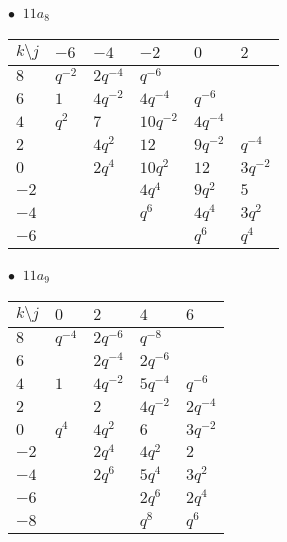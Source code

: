 \begin{minipage}{\linewidth}
$\bullet\ $ $11a_{8}$ \vspace{0.5em} \\
\begin{tabular}{l|lllll}
$k \setminus j$ & $-6$ & $-4$ & $-2$ & $0$ & $2$ \\
\hline
$8$ & $q^{-2}$ & $2q^{-4}$ & $q^{-6}$ &  &  \\
$6$ & $1$ & $4q^{-2}$ & $4q^{-4}$ & $q^{-6}$ &  \\
$4$ & $q^{2}$ & $7$ & $10q^{-2}$ & $4q^{-4}$ &  \\
$2$ &  & $4q^{2}$ & $12$ & $9q^{-2}$ & $q^{-4}$ \\
$0$ &  & $2q^{4}$ & $10q^{2}$ & $12$ & $3q^{-2}$ \\
$-2$ &  &  & $4q^{4}$ & $9q^{2}$ & $5$ \\
$-4$ &  &  & $q^{6}$ & $4q^{4}$ & $3q^{2}$ \\
$-6$ &  &  &  & $q^{6}$ & $q^{4}$ \\
\end{tabular}
\vspace{2em}
\end{minipage}
%
\begin{minipage}{\linewidth}
$\bullet\ $ $11a_{9}$ \vspace{0.5em} \\
\begin{tabular}{l|llll}
$k \setminus j$ & $0$ & $2$ & $4$ & $6$ \\
\hline
$8$ & $q^{-4}$ & $2q^{-6}$ & $q^{-8}$ &  \\
$6$ &  & $2q^{-4}$ & $2q^{-6}$ &  \\
$4$ & $1$ & $4q^{-2}$ & $5q^{-4}$ & $q^{-6}$ \\
$2$ &  & $2$ & $4q^{-2}$ & $2q^{-4}$ \\
$0$ & $q^{4}$ & $4q^{2}$ & $6$ & $3q^{-2}$ \\
$-2$ &  & $2q^{4}$ & $4q^{2}$ & $2$ \\
$-4$ &  & $2q^{6}$ & $5q^{4}$ & $3q^{2}$ \\
$-6$ &  &  & $2q^{6}$ & $2q^{4}$ \\
$-8$ &  &  & $q^{8}$ & $q^{6}$ \\
\end{tabular}
\vspace{2em}
\end{minipage}
%
